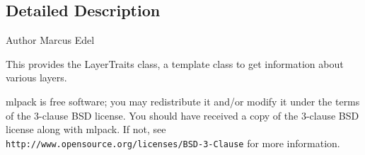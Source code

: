 \subsection{Detailed Description}
\begin{DoxyAuthor}{Author}
Marcus Edel
\end{DoxyAuthor}
This provides the Layer\+Traits class, a template class to get information about various layers.

mlpack is free software; you may redistribute it and/or modify it under the terms of the 3-\/clause B\+SD license. You should have received a copy of the 3-\/clause B\+SD license along with mlpack. If not, see {\tt http\+://www.\+opensource.\+org/licenses/\+B\+S\+D-\/3-\/\+Clause} for more information. 